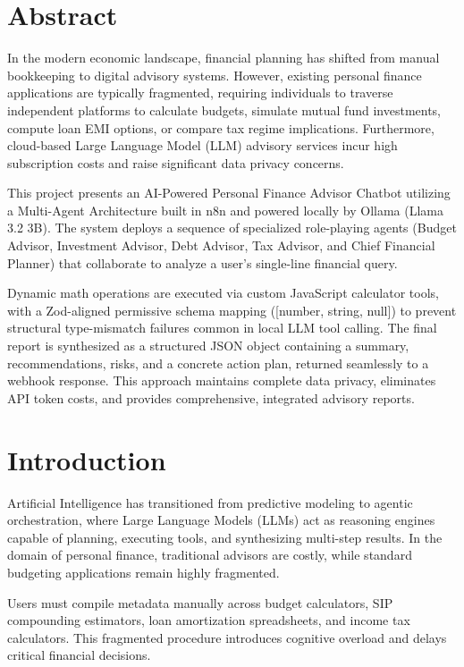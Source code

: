 \documentclass[12pt,a4paper]{report}
\begin{document}
\chapter*{Abstract}
In the modern economic landscape, financial planning has shifted from manual bookkeeping to digital advisory systems. However, existing personal finance applications are typically fragmented, requiring individuals to traverse independent platforms to calculate budgets, simulate mutual fund investments, compute loan EMI options, or compare tax regime implications. Furthermore, cloud-based Large Language Model (LLM) advisory services incur high subscription costs and raise significant data privacy concerns. 

This project presents an AI-Powered Personal Finance Advisor Chatbot utilizing a Multi-Agent Architecture built in n8n and powered locally by Ollama (Llama 3.2 3B). The system deploys a sequence of specialized role-playing agents (Budget Advisor, Investment Advisor, Debt Advisor, Tax Advisor, and Chief Financial Planner) that collaborate to analyze a user's single-line financial query. 

Dynamic math operations are executed via custom JavaScript calculator tools, with a Zod-aligned permissive schema mapping ([number, string, null]) to prevent structural type-mismatch failures common in local LLM tool calling. The final report is synthesized as a structured JSON object containing a summary, recommendations, risks, and a concrete action plan, returned seamlessly to a webhook response. This approach maintains complete data privacy, eliminates API token costs, and provides comprehensive, integrated advisory reports.


\clearpage
\chapter{Introduction}
\setcounter{page}{1}
Artificial Intelligence has transitioned from predictive modeling to agentic orchestration, where Large Language Models (LLMs) act as reasoning engines capable of planning, executing tools, and synthesizing multi-step results. In the domain of personal finance, traditional advisors are costly, while standard budgeting applications remain highly fragmented. 

Users must compile metadata manually across budget calculators, SIP compounding estimators, loan amortization spreadsheets, and income tax calculators. This fragmented procedure introduces cognitive overload and delays critical financial decisions.
\end{document}

